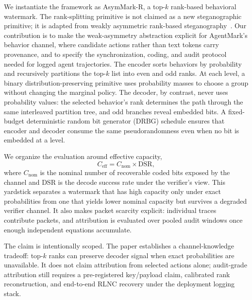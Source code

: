 \documentclass[conference,compsoc]{IEEEtran}
\newcommand{\ours}{AsymMark-R}
\newcommand{\Ceff}{\ensuremath{C_{\mathrm{eff}}}}
\begin{document}
We instantiate the framework as \ours{}, a top-$k$ rank-based behavioral watermark. The rank-splitting primitive is not claimed as a new steganographic primitive; it is adapted from weakly asymmetric rank-based steganography~\cite{weakasym2026}. Our contribution is to make the weak-asymmetry abstraction explicit for AgentMark's behavior channel, where candidate actions rather than text tokens carry provenance, and to specify the synchronization, coding, and audit protocol needed for logged agent trajectories. The encoder sorts behaviors by probability and recursively partitions the top-$k$ list into even and odd ranks. At each level, a binary distribution-preserving primitive uses probability masses to choose a group without changing the marginal policy. The decoder, by contrast, never uses probability values: the selected behavior's rank determines the path through the same interleaved partition tree, and odd branches reveal embedded bits. A fixed-budget deterministic random bit generator (DRBG) schedule ensures that encoder and decoder consume the same pseudorandomness even when no bit is embedded at a level.

We organize the evaluation around effective capacity,
\begin{equation}
  \Ceff = C_{\mathrm{nom}}\times\mathrm{DSR},
\end{equation}
where $C_{\mathrm{nom}}$ is the nominal number of recoverable coded bits exposed by the channel and DSR is the decode success rate under the verifier's view. This yardstick separates a watermark that has high capacity only under exact probabilities from one that yields lower nominal capacity but survives a degraded verifier channel. It also makes packet scarcity explicit: individual traces contribute packets, and attribution is evaluated over pooled audit windows once enough independent equations accumulate.

The claim is intentionally scoped. The paper establishes a channel-knowledge tradeoff: top-$k$ ranks can preserve decoder signal when exact probabilities are unavailable. It does not claim attribution from selected actions alone; audit-grade attribution still requires a pre-registered key/payload claim, calibrated rank reconstruction, and end-to-end RLNC recovery under the deployment logging stack.
\end{document}
